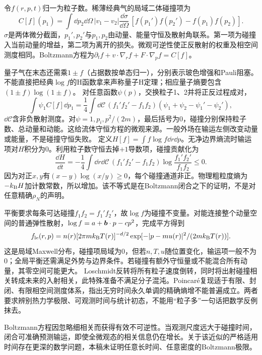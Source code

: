 \label{ch:boltzmann}
令$f(r,p,t)$归一为粒子数。稀薄经典气的局域二体碰撞项为
\begin{equation}
C[f](p_1)=\int\dd p_2\dd\Omega\,|v_1-v_2|\frac{\dd\sigma}{\dd\Omega}\,[f(p_1')f(p_2')-f(p_1)f(p_2)].
\end{equation}
$\sigma$是两体微分截面，$p_1',p_2'$与$p_1,p_2$由动量、能量守恒及散射角联系。第一项为碰撞入当前动量的增益，第二项为离开的损失。微观可逆性使正反散射的权重及相空间测度相同。Boltzmann方程为$\partial_tf+v\cdot\nabla_rf+F\cdot\nabla_pf=C[f]$。

量子气在末态还需乘$1\pm f$（占据数按单态归一），分别表示玻色增强和Pauli阻塞。不能直接把经典$\log f$的H函数拿来声称量子H定理；相应量子熵要包含$(1\pm f)\log(1\pm f)$。
对任意函数$\psi(p)$，交换粒子1、2并将正反过程成对，
\begin{equation}
\int\psi_1C[f]\dd p_1=\frac14\int\dd\mathcal C\,(f_1'f_2'-f_1f_2)(\psi_1+\psi_2-\psi_1'-\psi_2'),
\end{equation}
$\dd\mathcal C$含非负散射测度。对$\psi=1,p_i,p^2/(2m)$，最后括号为0，碰撞分别保持粒子数、总动量和动能。这给流体守恒方程的微观来源。一般外场在输运左侧改变动量或能量，不是碰撞守恒失败。
定义$H[f]=\int f\log f\dd r\dd p$。无净边界熵流时输运项对$H$积分为0。利用粒子数守恒去掉$+1$导数项，碰撞贡献化为
\begin{equation}
\frac{\dd H}{\dd t}=-\frac14\int\dd r\dd\mathcal C\,(f_1'f_2'-f_1f_2)\log\frac{f_1'f_2'}{f_1f_2}\le0.
\end{equation}
因为对正$x,y$有$(x-y)\log(x/y)\ge0$，每个碰撞通道非正。物理粗粒度熵为$-k_{\mathrm B} H$加计数常数，所以增加。该不等式是在Boltzmann闭合之下的证明，不是对任意精确$\rho_N$的声明。

平衡要求每条可达碰撞$f_1f_2=f_1'f_2'$，故$\log f$为碰撞不变量。对能连接整个动量空间的普通弹性散射，$\log f=a+\boldsymbol{b}\cdot p-cp^2$，完成平方得到
\begin{equation}
f_{\mathrm{le}}(r,p)=n(r)[2\pi mk_{\mathrm B} T(r)]^{-d/2}\exp[-|p-mu(r)|^2/(2mk_{\mathrm B} T(r))].
\end{equation}
这是局域Maxwell分布，碰撞项局域为0，但若$n,T,u$随位置变化，输运项一般不为0；全局平衡还需满足外势与边界条件。若碰撞有额外守恒量或不能混合所有动量，其零空间可能更大。
Loschmidt反转将所有粒子速度倒转，同时将出射碰撞相关转成未来的入射相关，此特殊准备不满足分子混沌。Poincaré复现适于有限、封闭、有限相空间测度体系，指出无穷时间永久单调的精确熵增不能普遍成立。两者要求辨别热力学极限、可观测时间与统计初态，不能用“粒子多”一句话把数学反例抹去。

Boltzmann方程因忽略细相关而获得有效不可逆性。当观测尺度远大于碰撞时间，闭合可准确预测输运，即使全微观态的相关信息仍在增长。关于该近似的严格适用时间存在更深的数学问题，本稿未证明任意长时间、任意密度的Boltzmann极限。
